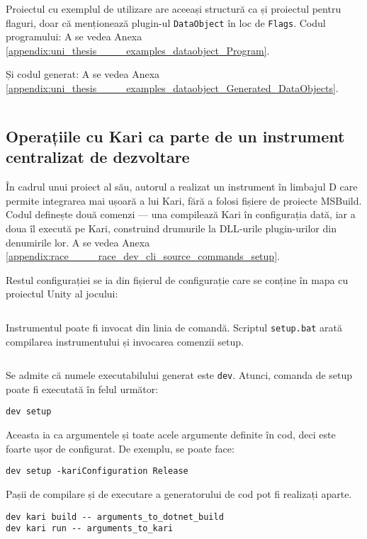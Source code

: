 \documentclass[a4paper,12pt]{report}
\begin{document}
Proiectul cu exemplul de utilizare are aceeași structură ca și proiectul pentru flaguri, doar că menționează plugin-ul \texttt{DataObject} în loc de \texttt{Flags}.
Codul programului:
A se vedea Anexa \ref{appendix:uni_thesis____examples_dataobject_Program}.

Și codul generat:
A se vedea Anexa \ref{appendix:uni_thesis____examples_dataobject_Generated_DataObjects}.
\inputminted{cs}{../examples/dataobject/Generated/DataObjectAnnotations.cs}

\subsection{Operațiile cu Kari ca parte de un instrument centralizat de dezvoltare}

În cadrul unui proiect al său, autorul a realizat un instrument în limbajul D care permite integrarea mai ușoară a lui Kari, fără a folosi fișiere de proiecte MSBuild.
Codul definește două comenzi — una compilează Kari în configurația dată, iar a doua îl execută pe Kari, construind drumurile la \ac{DLL}-urile plugin-urilor din denumirile lor.
A se vedea Anexa \ref{appendix:race____race_dev_cli_source_commands_setup}.

Restul configurației se ia din fișierul de configurație care se conține în mapa cu proiectul Unity al jocului:
\inputminted{js}{../race/game/kari.json}

Instrumentul poate fi invocat din linia de comandă.
Scriptul \texttt{setup.bat} arată compilarea instrumentului și invocarea comenzii setup.
\inputminted{bat}{../race/setup.bat}

Se admite că numele executabilului generat este \texttt{dev}.
Atunci, comanda de setup poate fi executată în felul următor:

\begin{verbatim}
dev setup
\end{verbatim}

Aceasta ia ca argumentele și toate acele argumente definite în cod, deci este foarte ușor de configurat.
De exemplu, se poate face:

\begin{verbatim}
dev setup -kariConfiguration Release
\end{verbatim}

Pașii de compilare și de executare a generatorului de cod pot fi realizați aparte.

\begin{verbatim}
dev kari build -- arguments_to_dotnet_build
dev kari run -- arguments_to_kari
\end{verbatim}
\end{document}

